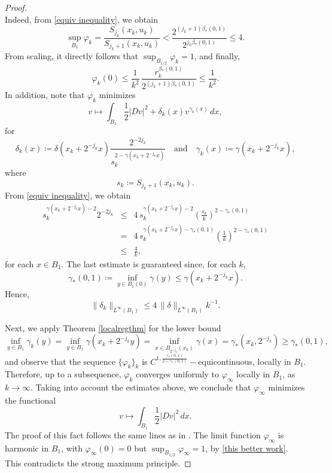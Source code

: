 \documentclass[reqno,11pt]{amsart}
\newcommand{\1}{\mathds{1}}
\numberwithin{equation}{section}
\begin{document}
\begin{proof}
\begin{equation}
\end{equation}
Indeed, from \eqref{equiv inequality}, we obtain
\[
\sup_{B_1} \varphi_k 
   = \frac{S_{j_k}(x_k,u_k)}{S_{j_k + 1}(x_k,u_k)}
   < \frac{2^{(j_k+1)\beta_\ast(0,1)}}{2^{j_k\beta_\ast(0,1)}} \leq 4.
\]
From scaling, it directly follows that $\sup_{B_{1/2}} \varphi_k = 1$, and finally,
$$
    \varphi_k(0) \leq \frac{1}{k^2}\,\frac{r_k^{\beta_\ast(0,1)}}{2^{(j_k+1)\beta_\ast(0,1)}} \leq \frac{1}{k^2}.
$$
In addition, note that $\varphi_k$ minimizes
$$
    v \longmapsto \int_{B_1} \frac{1}{2} \left| Dv \right|^2 + \delta_k(x) v^{\gamma_k(x)}\, dx,
$$
for
$$
    \delta_k(x)\coloneqq  \delta(x_k+2^{-j_k}x)\frac{2^{-2j_k}}{s_k^{2-\gamma(x_k+2^{-j_k}x)}} \quad \text{and} \quad \gamma_k(x)\coloneqq \gamma(x_k+2^{-j_k}x),
$$ 
where
$$
    s_k \coloneqq S_{j_k + 1}(x_k,u_k).
$$
From \eqref{equiv inequality}, we obtain
\begin{eqnarray*}
s_k^{\gamma(x_k+2^{-j_k}x)-2}2^{-2j_k} & \leq & 4 \,s_k^{\gamma(x_k+2^{-j_k}x)-2} \left( \frac{s_k}{k}\right)^{2-\gamma_\ast(0,1)} \\
& = & 4\,s_k^{\gamma(x_k+2^{-j_k}x)-\gamma_\ast(0,1)} \left( \frac{1}{k}\right)^{2-\gamma_\ast(0,1)}\\
& \leq & \frac{4}{k},
\end{eqnarray*}
for each $x \in B_1$. The last estimate is guaranteed since, for each $k$, 
$$
    \gamma_\ast(0,1) \coloneqq \inf_{y \in B_{1}(0)}\gamma(y) \leq \gamma(x_k+2^{-j_k}x).
$$
Hence,
\begin{equation}\nonumber
    \|\delta_k\|_{L^\infty(B_1)} \leq 4\,\|\delta\|_{L^\infty(B_1)} k^{-1}.
\end{equation}

Next, we apply Theorem \ref{localregthm} for the lower bound 
$$
    \inf_{y \in B_1}\gamma_k(y) = \inf_{y \in B_1} \gamma(x_k+2^{-j_k}y) = \inf_{x \in B_{2^{-j_k}}(x_k)}\gamma(x) = \gamma_\ast(x_k,2^{-j_k}) \geq \gamma_\ast(0,1),
$$
and observe that the sequence $\{\varphi_k\}_k$ is  $C^{1,\frac{\gamma_\ast(0,1)}{2-\gamma_\ast(0,1)}}-$equicontinuous, locally in $B_1$. Therefore, up to a subsequence, $\varphi_k$ converges uniformly to $\varphi_\infty$ locally in $B_1$, as $k\to \infty$.
Taking into account the estimates above, we conclude that $\varphi_\infty$ minimizes the functional 
$$
    v \longmapsto \int_{B_1} \frac{1}{2} \left| Dv \right|^2 \, dx.
$$ 
The proof of this fact follows the same lines as in \cite[Lemma 2.3 and Remark 1]{PT24}. The limit function \(\varphi_\infty\) is harmonic in \(B_1\), with \(\varphi_\infty(0)=0\) but \(\sup_{B_{1/2}} \varphi_\infty = 1\), by \eqref{this better work}. This contradicts the strong maximum principle. 
\end{proof}
\end{document}
